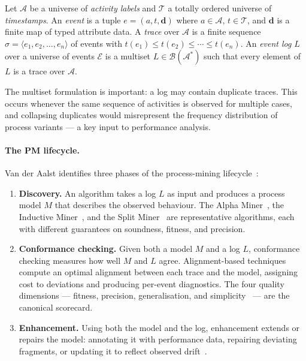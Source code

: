 \begin{definition}
\label{def:event-log}
Let $\mathcal{A}$ be a universe of \emph{activity labels} and $\mathcal{T}$ a
totally ordered universe of \emph{timestamps}. An \emph{event} is a tuple
$e = (a, t, \mathbf{d})$ where $a \in \mathcal{A}$, $t \in \mathcal{T}$, and
$\mathbf{d}$ is a finite map of typed attribute data. A \emph{trace} over
$\mathcal{A}$ is a finite sequence $\sigma = \langle e_1, e_2, \ldots, e_n
\rangle$ of events with $t(e_1) \leq t(e_2) \leq \cdots \leq t(e_n)$.
An \emph{event log} $L$ over a universe of events $\mathcal{E}$ is a multiset
$L \in \mathcal{B}(\mathcal{A}^*)$ such that every element of $L$ is a trace
over $\mathcal{A}$.
\end{definition}

The multiset formulation is important: a log may contain duplicate traces.
This occurs whenever the same sequence of activities is observed for multiple
cases, and collapsing duplicates would misrepresent the frequency distribution
of process variants --- a key input to performance analysis.

\paragraph{The PM lifecycle.}
Van der Aalst identifies three phases of the process-mining
lifecycle~\cite{vanderaalst2016process}:
\begin{enumerate}
  \item \textbf{Discovery.} An algorithm takes a log $L$ as input and produces
        a process model $M$ that describes the observed behaviour.
        The Alpha Miner~\cite{vanderaalst2004workflow}, the Inductive
        Miner~\cite{leemans2013discovering}, and the Split
        Miner~\cite{augusto2019split} are representative algorithms, each
        with different guarantees on soundness, fitness, and precision.
  \item \textbf{Conformance checking.} Given both a model $M$ and a log $L$,
        conformance checking measures how well $M$ and $L$ agree.
        Alignment-based techniques~\cite{adriansyah2011conformance} compute
        an optimal alignment between each trace and the model,
        assigning cost to deviations and producing per-event diagnostics.
        The four quality dimensions --- fitness, precision, generalisation, and
        simplicity~\cite{buijs2014quality} --- are the canonical scorecard.
  \item \textbf{Enhancement.} Using both the model and the log, enhancement
        extends or repairs the model: annotating it with performance data,
        repairing deviating fragments, or updating it to reflect observed
        drift~\cite{vanderaalst2016process}.
\end{enumerate}

